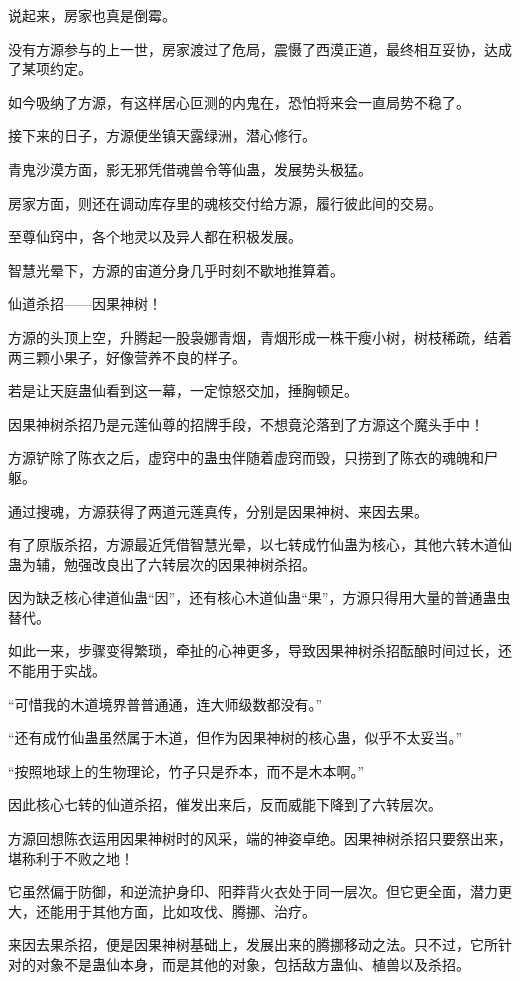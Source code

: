 \begin{this_body}
说起来，房家也真是倒霉。

没有方源参与的上一世，房家渡过了危局，震慑了西漠正道，最终相互妥协，达成了某项约定。

如今吸纳了方源，有这样居心叵测的内鬼在，恐怕将来会一直局势不稳了。

接下来的日子，方源便坐镇天露绿洲，潜心修行。

青鬼沙漠方面，影无邪凭借魂兽令等仙蛊，发展势头极猛。

房家方面，则还在调动库存里的魂核交付给方源，履行彼此间的交易。

至尊仙窍中，各个地灵以及异人都在积极发展。

智慧光晕下，方源的宙道分身几乎时刻不歇地推算着。

仙道杀招——因果神树！

方源的头顶上空，升腾起一股袅娜青烟，青烟形成一株干瘦小树，树枝稀疏，结着两三颗小果子，好像营养不良的样子。

若是让天庭蛊仙看到这一幕，一定惊怒交加，捶胸顿足。

因果神树杀招乃是元莲仙尊的招牌手段，不想竟沦落到了方源这个魔头手中！

方源铲除了陈衣之后，虚窍中的蛊虫伴随着虚窍而毁，只捞到了陈衣的魂魄和尸躯。

通过搜魂，方源获得了两道元莲真传，分别是因果神树、来因去果。

有了原版杀招，方源最近凭借智慧光晕，以七转成竹仙蛊为核心，其他六转木道仙蛊为辅，勉强改良出了六转层次的因果神树杀招。

因为缺乏核心律道仙蛊“因”，还有核心木道仙蛊“果”，方源只得用大量的普通蛊虫替代。

如此一来，步骤变得繁琐，牵扯的心神更多，导致因果神树杀招酝酿时间过长，还不能用于实战。

“可惜我的木道境界普普通通，连大师级数都没有。”

“还有成竹仙蛊虽然属于木道，但作为因果神树的核心蛊，似乎不太妥当。”

“按照地球上的生物理论，竹子只是乔本，而不是木本啊。”

因此核心七转的仙道杀招，催发出来后，反而威能下降到了六转层次。

方源回想陈衣运用因果神树时的风采，端的神姿卓绝。因果神树杀招只要祭出来，堪称利于不败之地！

它虽然偏于防御，和逆流护身印、阳莽背火衣处于同一层次。但它更全面，潜力更大，还能用于其他方面，比如攻伐、腾挪、治疗。

来因去果杀招，便是因果神树基础上，发展出来的腾挪移动之法。只不过，它所针对的对象不是蛊仙本身，而是其他的对象，包括敌方蛊仙、植兽以及杀招。


\end{this_body}
